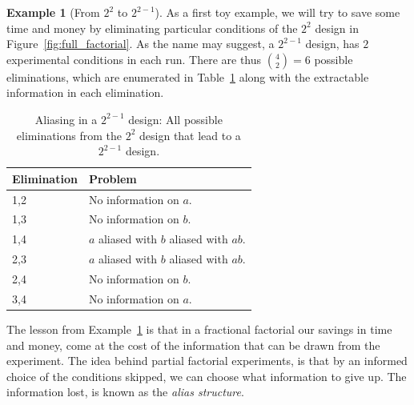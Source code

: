 \documentclass[12pt,a4paper]{report}
\theoremstyle{plain}
\theoremstyle{definition}
\newtheorem{example}{Example}
\begin{document}
\begin{example}[From $2^2$ to $2^{2-1}$]
\label{eg:fractional_factorial}
As a first toy example, we will try to save some time and money by eliminating particular conditions of the $2^2$ design in Figure~\ref{fig:full_factorial}.
As the name may suggest, a $2^{2-1}$ design, has $2$ experimental conditions in each run. 
There are thus $\binom{4}{2}=6$ possible eliminations, which are enumerated in Table~\ref{tab:partial_factorial} along with the extractable information in each elimination.
\begin{table}[ht]
\begin{tabular}{|p{2.5cm}|p{10cm}|}
\hline Elimination &  Problem \\ 
\hline
\hline 1,2 &  No information on $a$. \\ 
\hline 1,3 &  No information on $b$.\\ 
\hline 1,4 &  $a$ aliased with $b$ aliased with $ab$. \\ 
\hline 2,3 &  $a$ aliased with $b$ aliased with $ab$. \\ 
\hline 2,4 &  No information on $b$. \\ 
\hline 3,4 &  No information on $a$.\\ 
\hline 
\end{tabular} 
\caption[Aliasing]{Aliasing in a $2^{2-1}$ design: All possible eliminations from the $2^2$ design that lead to a $2^{2-1}$ design.}
\label{tab:partial_factorial}
\end{table}
\end{example}

The lesson from Example~\ref{eg:fractional_factorial} is that in a fractional factorial our savings in time and money, come at the cost of the information that can be drawn from the experiment.
The idea behind partial factorial experiments, is that by an informed choice of the conditions skipped, we can choose what information to give up. The information lost, is known as the \emph{alias structure}.
\end{document}
